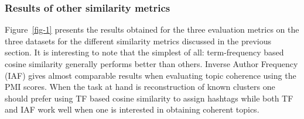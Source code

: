 \documentclass[10pt,a5paper,twoside]{article}
\begin{document}
\subsubsection{Results of other similarity metrics}
Figure~\ref{fig-1} presents the results obtained for the three evaluation metrics on the three datasets for the different similarity metrics discussed in the previous section. It is interesting to note that the simplest of all: term-frequency based cosine similarity generally performs better than others. Inverse Author Frequency (IAF) gives almost comparable results when evaluating topic coherence using the PMI scores. When the task at hand is reconstruction of known clusters one should prefer using TF based cosine similarity to assign hashtags while both TF and IAF work well when one is interested in obtaining coherent topics.\\
\end{document}

